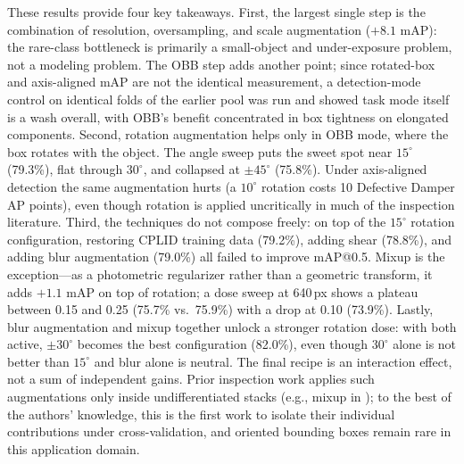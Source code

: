 \documentclass[conference]{IEEEtran}
\makeatletter
\newcommand{\dd}{Defective Damper}
\newcommand{\map}{mAP@0.5}
\makeatother
\begin{document}
These results provide four key takeaways. First, the largest single step is the combination of resolution, oversampling, and scale augmentation ($+8.1$ mAP): the rare-class bottleneck is primarily a small-object and under-exposure problem, not a modeling problem. The OBB step adds another point; since rotated-box and axis-aligned mAP are not the identical measurement, a detection-mode control on identical folds of the earlier pool was run and showed task mode itself is a wash overall, with OBB's benefit concentrated in box tightness on elongated components. Second, rotation augmentation helps only in OBB mode, where the box rotates with the object. The angle sweep puts the sweet spot near $15^\circ$ (79.3\%), flat through $30^\circ$, and collapsed at $\pm45^\circ$ (75.8\%). Under axis-aligned detection the same augmentation hurts (a $10^\circ$ rotation costs 10 \dd{} AP points), even though rotation is applied uncritically in much of the inspection literature. Third, the techniques do not compose freely: on top of the $15^\circ$ rotation configuration, restoring CPLID training data (79.2\%), adding shear (78.8\%), and adding blur augmentation (79.0\%) all failed to improve \map{}. Mixup is the exception---as a photometric regularizer rather than a geometric transform, it adds $+1.1$ mAP on top of rotation; a dose sweep at 640\,px shows a plateau between 0.15 and 0.25 (75.7\% vs.\ 75.9\%) with a drop at 0.10 (73.9\%). Lastly, blur augmentation and mixup together unlock a stronger rotation dose: with both active, $\pm30^\circ$ becomes the best configuration (82.0\%), even though $30^\circ$ alone is not better than $15^\circ$ and blur alone is neutral. The final recipe is an interaction effect, not a sum of independent gains. Prior inspection work applies such augmentations only inside undifferentiated stacks (e.g., mixup in \cite{farooq2026teyolov8}); to the best of the authors' knowledge, this is the first work to isolate their individual contributions under cross-validation, and oriented bounding boxes remain rare in this application domain.
\end{document}
